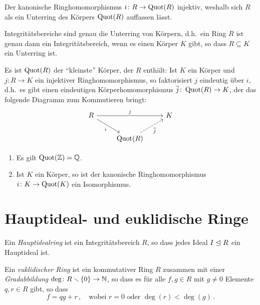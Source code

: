 Der kanonische Ringhomomorphismus $i \colon R \to \operatorname{Quot}(R)$ injektiv, weshalb sich $R$ als ein Unterring des Körpers $\operatorname{Quot}(R)$ auffassen lässt.

\begin{corollary}
  Integritätsbereiche sind genau die Unterring von Körpern, d.h.\ ein Ring $R$ ist genau dann ein Integritätsbereich, wenn es einen Körper $K$ gibt, so dass $R \subseteq K$ ein Unterring ist.
\end{corollary}

Es ist $\operatorname{Quot}(R)$ der \enquote{kleinste} Körper, der $R$ enthält:
Ist $K$ ein Körper und $j \colon R \to K$ ein injektiver Ringhomomorphismus, so faktorisiert $j$ eindeutig über $i$, d.h.\ es gibt einen eindeutigen Körperhomomorphismus $\overline{j} \colon \operatorname{Quot}(R) \to K$, der das folgende Diagramm zum Kommutieren bringt:
\[
  \begin{tikzcd}
      R
      \arrow{rr}[above]{j}
      \arrow{dr}[below left]{i}
    & {}
    & K
    \\
      {}
    & \Quot{R}
      \arrow[dashed]{ur}[below right]{\induced{j}}
    & {}
  \end{tikzcd}
\]

\begin{example}
  \begin{enumerate}
    \item
      Es gilt $\operatorname{Quot}(\mathbb{Z}) = \mathbb{Q}$.
    \item
      Ist $K$ ein Körper, so ist der kanonische Ringhomomorphismus $i \colon K \to \operatorname{Quot}(K)$ ein Isomorphismus.
  \end{enumerate}
\end{example}









\section{Hauptideal- und euklidische Ringe}

\begin{definition}
  Ein \emph{Hauptidealring} ist ein Integritätsbereich $R$, so dass jedes Ideal $I \mathrel{\trianglelefteq} R$ ein Hauptideal ist.
\end{definition}

\begin{definition}
  Ein \emph{euklidischer Ring} ist ein kommutativer Ring $R$ zusammen mit einer \emph{Gradabbildung} $\deg \colon R \smallsetminus \{0\} \to \mathbb{N}$, so dass es für alle $f, g \in R$ mit $g \neq 0$ Elemente $q, r \in R$ gibt, so dass
  \[
    f = qg + r \,,
    \quad
    \text{wobei $r = 0$ oder $\deg(r) < \deg(g)$} \,.
  \]
\end{definition}

